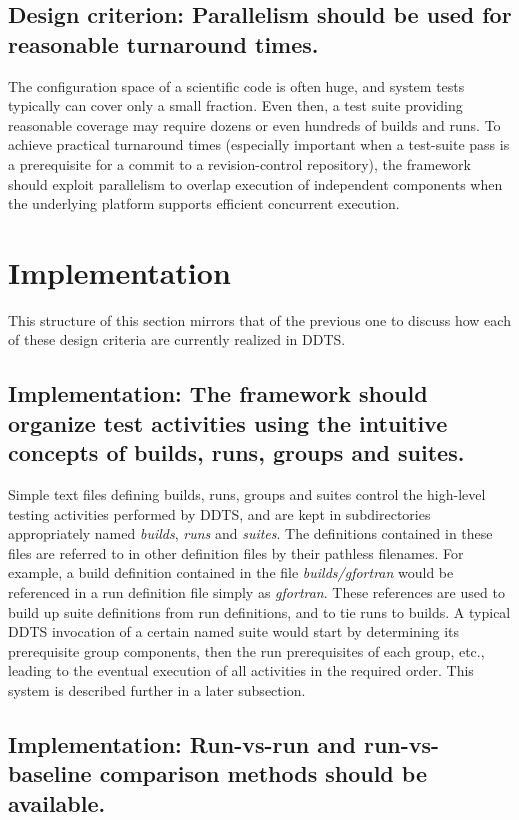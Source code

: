 \documentclass[conference]{IEEEtran}
\begin{document}
\subsection{Design criterion: Parallelism should be used for reasonable turnaround times.}

The configuration space of a scientific code is often huge, and system tests typically can cover only a small fraction. Even then, a test suite providing reasonable coverage may require dozens or even hundreds of builds and runs. To achieve practical turnaround times (especially important when a test-suite pass is a prerequisite for a commit to a revision-control repository), the framework should exploit parallelism to overlap execution of independent components when the underlying platform supports efficient concurrent execution.

\section{Implementation}

This structure of this section mirrors that of the previous one to discuss how each of these design criteria are currently realized in DDTS.

\subsection{Implementation: The framework should organize test activities using the intuitive concepts of builds, runs, groups and suites.}

Simple text files defining builds, runs, groups and suites control the high-level testing activities performed by DDTS, and are kept in subdirectories appropriately named \emph{builds}, \emph{runs} and \emph{suites}. The definitions contained in these files are referred to in other definition files by their pathless filenames. For example, a build definition contained in the file \emph{builds/gfortran} would be referenced in a run definition file simply as \emph{gfortran}. These references are used to build up suite definitions from run definitions, and to tie runs to builds. A typical DDTS invocation of a certain named suite would start by determining its prerequisite group components, then the run prerequisites of each group, etc., leading to the eventual execution of all activities in the required order. This system is described further in a later subsection.

\subsection{Implementation: Run-vs-run and run-vs-baseline comparison methods should be available.}
\end{document}
